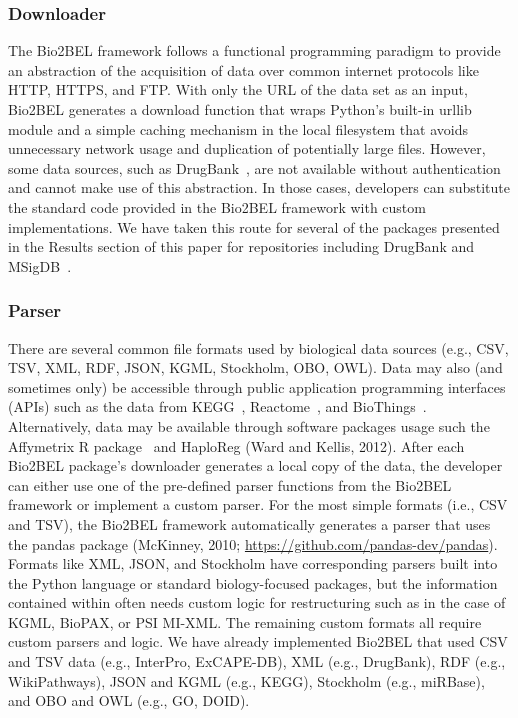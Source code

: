 \subsubsection*{Downloader}
The Bio2BEL framework follows a functional programming paradigm to provide an abstraction of the acquisition of data over common internet protocols like HTTP, HTTPS, and FTP\@.
With only the URL of the data set as an input, Bio2BEL generates a download function that wraps Python's built-in urllib module and a simple caching mechanism in the local filesystem that avoids unnecessary network usage and duplication of potentially large files.
However, some data sources, such as DrugBank~\cite{Wishart2018}, are not available without authentication and cannot make use of this abstraction. In those cases, developers can substitute the standard code provided in the Bio2BEL framework with custom implementations.
We have taken this route for several of the packages presented in the Results section of this paper for repositories including DrugBank and MSigDB~\cite{Liberzon2015}.

\subsubsection*{Parser}
There are several common file formats used by biological data sources (e.g., CSV, TSV, XML, RDF, JSON, KGML, Stockholm, OBO, OWL).
Data may also (and sometimes only) be accessible through public application programming interfaces (APIs) such as the data from KEGG~\cite{Kanehisa2017}, Reactome~\cite{Fabregat2018}, and BioThings~\cite{Xin2016}.
Alternatively, data may be available through software packages usage such the Affymetrix R package~\cite{Gautier2004} and HaploReg (Ward and Kellis, 2012).
After each Bio2BEL package's downloader generates a local copy of the data, the developer can either use one of the pre-defined parser functions from the Bio2BEL framework or implement a custom parser.
For the most simple formats (i.e., CSV and TSV), the Bio2BEL framework automatically generates a parser that uses the pandas package (McKinney, 2010; \url{https://github.com/pandas-dev/pandas}).
Formats like XML, JSON, and Stockholm have corresponding parsers built into the Python language or standard biology-focused packages, but the information contained within often needs custom logic for restructuring such as in the case of KGML, BioPAX, or PSI MI-XML.
The remaining custom formats all require custom parsers and logic.
We have already implemented Bio2BEL that used CSV and TSV data (e.g., InterPro, ExCAPE-DB), XML (e.g., DrugBank), RDF (e.g., WikiPathways), JSON and KGML (e.g., KEGG), Stockholm (e.g., miRBase), and OBO and OWL (e.g., GO, DOID).

